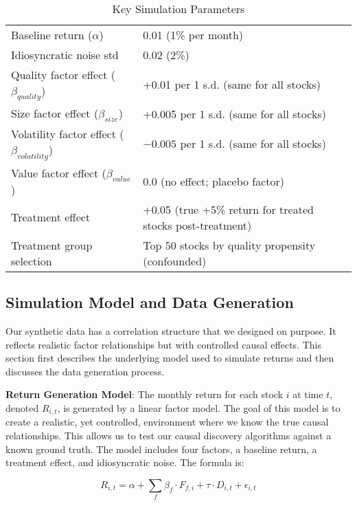 \begin{table}[ht]
\centering
\caption{Key Simulation Parameters}
\label{tab:sim_params}
\begin{tabular}{l l}
\hline
Baseline return ($\alpha$) & 0.01 (1\% per month) \\
Idiosyncratic noise std & 0.02 (2\%) \\
Quality factor effect ($\beta_{quality}$) & +0.01 per 1 s.d. (same for all stocks) \\
Size factor effect ($\beta_{size}$) & +0.005 per 1 s.d. (same for all stocks) \\
Volatility factor effect ($\beta_{volatility}$) & $-0.005$ per 1 s.d. (same for all stocks) \\
Value factor effect ($\beta_{value}$) & 0.0 (no effect; placebo factor) \\
Treatment effect & +0.05 (true +5\% return for treated stocks post-treatment) \\
Treatment group selection & Top 50 stocks by quality propensity (confounded) \\
\hline
\end{tabular}
\end{table}

\subsection*{Simulation Model and Data Generation}

Our synthetic data has a correlation structure that we designed on purpose. It reflects realistic factor relationships but with controlled causal effects. This section first describes the underlying model used to simulate returns and then discusses the data generation process.

\textbf{Return Generation Model}: The monthly return for each stock $i$ at time $t$, denoted $R_{i,t}$, is generated by a linear factor model. The goal of this model is to create a realistic, yet controlled, environment where we know the true causal relationships. This allows us to test our causal discovery algorithms against a known ground truth. The model includes four factors, a baseline return, a treatment effect, and idiosyncratic noise. The formula is:

\[
R_{i,t} = \alpha + \sum_{f} \beta_f \cdot F_{f,i} + \tau \cdot D_{i,t} + \epsilon_{i,t}
\]

